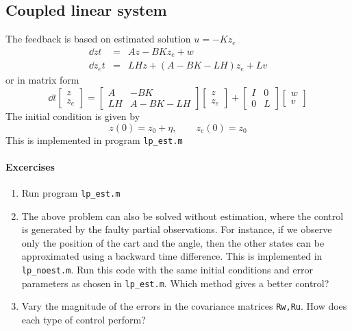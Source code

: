 \documentclass[12pt]{article}
\begin{document}
\subsection{Coupled linear system}
The feedback is based on estimated solution $u = -K z_e$
\begin{eqnarray*}
\dd{z}{t} &=& A z - B K z_e + w \\
\dd{z_e}{t} &=& L H z + (A - B K - L H) z_e + L v
\end{eqnarray*}
or in matrix form
\[
\dd{}{t} \begin{bmatrix}
z \\
z_e \end{bmatrix} = \begin{bmatrix}
A & -B K \\
L H & A - B K - L H \end{bmatrix} \begin{bmatrix}
z \\ z_e \end{bmatrix} + \begin{bmatrix}
I & 0 \\
0 & L \end{bmatrix} \begin{bmatrix}
w \\ v \end{bmatrix}
\]
The initial condition is given by
\[
z(0) = z_0 + \eta, \qquad z_e(0) = z_0
\]
This is implemented in program {\tt lp\_est.m}

\paragraph{Excercises}

\begin{enumerate}

\item Run program {\tt lp\_est.m}

\item The above problem can also be solved without estimation, where the control is generated by the faulty partial observations. For instance, if we observe only the position of the cart and the angle, then the other states can be approximated using a backward time difference. This is implemented in {\tt lp\_noest.m}. Run this code with the same initial conditions and error parameters as chosen in {\tt lp\_est.m}. Which method gives a better control?  

\item Vary the magnitude of the errors in the covariance matrices {\tt Rw,Ru}. How does each type of control perform?
\end{enumerate}
\end{document}
